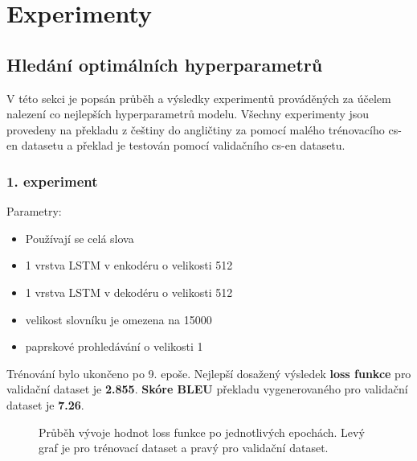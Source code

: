 \section{Experimenty}

\subsection{Hledání optimálních hyperparametrů}\label{subsection:experimentsOptimal}
V této sekci je popsán průběh a výsledky experimentů prováděných za účelem nalezení co nejlepších hyperparametrů modelu. Všechny experimenty jsou provedeny na překladu z češtiny do angličtiny za pomocí malého trénovacího cs-en datasetu a překlad je testován pomocí validačního cs-en datasetu.

\subsubsection{1. experiment}\label{experiment1}
Parametry:
\begin{itemize}
  \item Používají se celá slova
  \item 1 vrstva LSTM v enkodéru o velikosti 512
  \item 1 vrstva LSTM v dekodéru o velikosti 512
  \item velikost slovníku je omezena na 15000
  \item paprskové prohledávání o velikosti 1
\end{itemize}

Trénování bylo ukončeno po 9. epoše. Nejlepší dosažený výsledek \textbf{loss funkce} pro validační dataset je \textbf{2.855}. \textbf{Skóre BLEU} překladu vygenerovaného pro validační dataset je \textbf{7.26}.

\begin{figure}[H]
    \begin{center}
    \end{center}
	\caption{Průběh vývoje hodnot loss funkce po jednotlivých epochách. Levý graf je pro trénovací dataset a pravý pro validační dataset.}
\end{figure}

